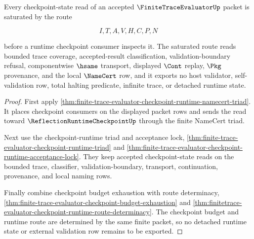 \begin{theorem}
\label{thm:finite-trace-evaluator-checkpoint-state-saturation-route}
Every checkpoint-state read of an accepted $\FiniteTraceEvaluatorUp$ packet is saturated by the route

$$
I,T,A,V,H,C,P,N
$$

before a runtime checkpoint consumer inspects it. The saturated route reads bounded trace coverage, accepted-result classification, validation-boundary refusal, componentwise $\hsame$ transport, displayed $\Cont$ replay, $\Pkg$ provenance, and the local $\NameCert$ row, and it exports no host validator, self-validation row, total halting predicate, infinite trace, or detached runtime state.
\end{theorem}
\begin{proof}
First apply \autoref{thm:finite-trace-evaluator-checkpoint-runtime-namecert-triad}. It places checkpoint consumers on the displayed packet rows and sends the read toward $\ReflectionRuntimeCheckpointUp$ through the finite NameCert triad.

Next use the checkpoint-runtime triad and acceptance lock, \autoref{thm:finite-trace-evaluator-checkpoint-runtime-triad} and \autoref{thm:finite-trace-evaluator-checkpoint-runtime-acceptance-lock}. They keep accepted checkpoint-state reads on the bounded trace, classifier, validation-boundary, transport, continuation, provenance, and local naming rows.

Finally combine checkpoint budget exhaustion with route determinacy, \autoref{thm:finite-trace-evaluator-checkpoint-budget-exhaustion} and \autoref{thm:finitetrace-evaluator-checkpoint-runtime-route-determinacy}. The checkpoint budget and runtime route are determined by the same finite packet, so no detached runtime state or external validation row remains to be exported.
\end{proof}

